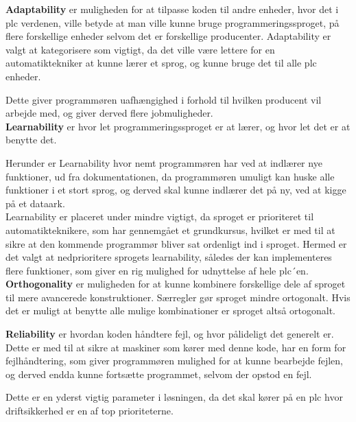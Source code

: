 \noindent\textbf{Adaptability} er muligheden for at tilpasse koden til andre enheder, hvor det i \gls{plc} verdenen, ville betyde at man ville kunne bruge programmeringssproget, på flere forskellige enheder selvom det er forskellige producenter. Adaptability er valgt at kategorisere som vigtigt, da det ville være lettere for en automatiktekniker at kunne lærer et sprog, og kunne bruge det til alle \gls{plc} enheder.

Dette giver programmøren uafhængighed i forhold til hvilken producent vil arbejde med, og giver derved flere jobmuligheder.\\

\noindent\textbf{Learnability} er hvor let programmeringssproget er at lærer, og hvor let det er at benytte det.

Herunder er Learnability hvor nemt programmøren har ved at indlærer nye funktioner, ud fra dokumentationen, da programmøren umuligt kan huske alle funktioner i et stort sprog, og derved skal kunne indlærer det på ny, ved at kigge på et dataark. \\
Learnability er placeret under mindre vigtigt, da sproget er prioriteret til automatikteknikere, som har gennemgået et grundkursus, hvilket er med til at sikre at den kommende programmør bliver sat ordenligt ind i sproget. Hermed er det valgt at nedprioritere sprogets learnability, således der kan implementeres flere funktioner, som giver en rig mulighed for udnyttelse af hele \gls{plc}´en.\\

\noindent\textbf{Orthogonality} er muligheden for at kunne kombinere forskellige dele af sproget til mere avancerede konstruktioner. Særregler gør sproget mindre ortogonalt. Hvis det er muligt at benytte alle mulige kombinationer er sproget altså ortogonalt.\\

\noindent\textbf{Reliability} er hvordan koden håndtere fejl, og hvor pålideligt det generelt er. Dette er med til at sikre at maskiner som kører med denne kode, har en form for fejlhåndtering, som giver programmøren mulighed for at kunne bearbejde fejlen, og derved endda kunne fortsætte programmet, selvom der opstod en fejl.

Dette er en yderst vigtig parameter i løsningen, da det skal kører på en \gls{plc} hvor driftsikkerhed er en af top prioriteterne.\\


